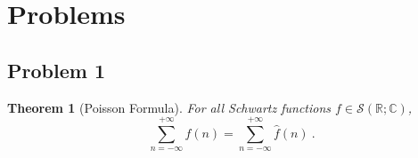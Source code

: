 \documentclass[12pt, reqno]{article}
\newtheorem{theorem}{Theorem}[section]
\theoremstyle{definition}
\theoremstyle{remark}
\begin{document}
\newpage
\section{Problems} 


\subsection*{Problem 1}
\vspace{0.1 cm}

\begin{theorem}[Poisson Formula] \label{th_poisson}
    For all Schwartz functions $f\in\mathcal{S}(\mathbb{R;C})$, 
    \begin{equation} \label{eq_poisson}
        \sum_{n=-\infty}^{+\infty} f(n) = \sum_{n=-\infty}^{+\infty} \widehat{f}(n) ~\mbox{.}
    \end{equation}
\end{theorem}

\end{document}
